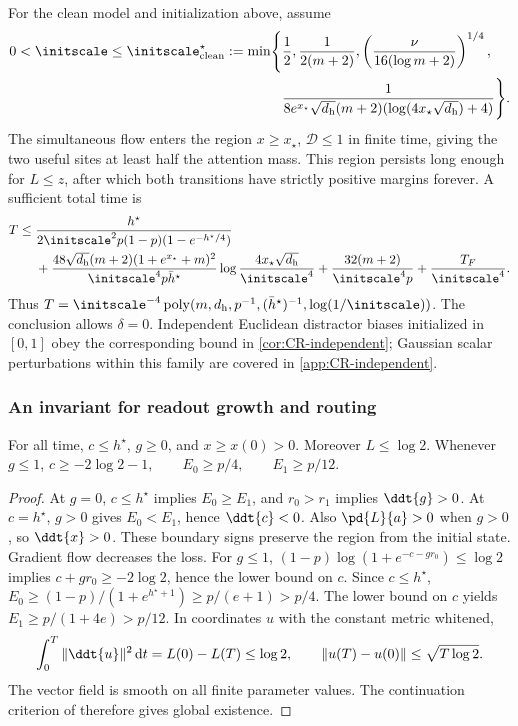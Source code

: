 \begin{proposition}\label{prop:clean-routing}
For the clean model and initialization above, assume
\begin{equation}
 \begin{aligned}
 0<\initscale\le\initscale^\star_{\mathrm{clean}}:=\min\Biggl\{&\frac12,\frac1{2(m+2)},
 \left(\frac{\nu}{16(\log m+2)}\right)^{1/4},\\
 &\frac1{8e^{x_\star}\sqrt{d_{\mathrm h}}(m+2)(\log(4x_\star\sqrt{d_{\mathrm h}})+4)}\Biggr\}.
 \end{aligned}
 \label{eq:CR-scale}
\end{equation}
The simultaneous flow enters the region $x\ge x_\star$, $\mathcal D\le1$ in finite time, giving the two useful sites at least half the attention mass. This region persists long enough for $L\le z$, after which both transitions have strictly positive margins forever. A sufficient total time is
\begin{align}
 T\le{}&\frac{h^\star}{2\initscale^2 p(1-p)(1-e^{-h^\star/4})}\notag\\
 &+\frac{48\sqrt{d_{\mathrm h}}(m+2)(1+e^{x_\star}+m)^2}{\initscale^4p\bar h^\star}
       \log\frac{4x_\star\sqrt{d_{\mathrm h}}}{\initscale^4}
 +\frac{32(m+2)}{\initscale^4p}+\frac{T_F}{\initscale^4}.\label{eq:CR-time}
\end{align}
Thus $T=\initscale^{-4}\operatorname{poly}(m,d_{\mathrm h},p^{-1},(\bar h^\star)^{-1},\log(1/\initscale))$.
The conclusion allows $\delta=0$. Independent Euclidean distractor biases
initialized in $[0,1]$ obey the corresponding bound in
\cref{cor:CR-independent}; Gaussian scalar perturbations within this family
are covered in \cref{app:CR-independent}.
\end{proposition}

\subsubsection{An invariant for readout growth and routing}
\begin{lemma}
\label{lem:CR-align}
For all time, $c\le h^\star$, $g\ge0$, and $x\ge x(0)>0$. Moreover $L\le\log2$. Whenever $g\le1$,
 $c\ge-2\log2-1,\qquad E_0\ge p/4,\qquad E_1\ge p/12.$ 
\end{lemma}
\begin{proof}
At $g=0$, $c\le h^\star$ implies $E_0\ge E_1$, and $r_0>r_1$ implies $\ddt{g}>0$.
At $c=h^\star$, $g>0$ gives $E_0<E_1$, hence $\ddt{c}<0$. Also $\pd{L}{a}>0$ when $g>0$, so $\ddt{x}>0$.
These boundary signs preserve the region from the initial state. Gradient flow decreases the loss.
For $g\le1$, $(1-p)\log(1+e^{-c-gr_0})\le\log2$ implies $c+gr_0\ge-2\log2$, hence the lower bound on $c$.
Since $c\le h^\star$,
$E_0\ge(1-p)/(1+e^{h^\star+1})\ge p/(e+1)>p/4$.
The lower bound on $c$ yields $E_1\ge p/(1+4e)>p/12$.
In coordinates $u$ with the constant metric whitened,
\[
 \int_0^T\|\ddt{u}\|^2\,\mathrm d t=L(0)-L(T)\le\log2,\qquad
 \|u(T)-u(0)\|\le\sqrt{T\log2}.
\]
The vector field is smooth on all finite parameter values. The continuation criterion of \citet[Corollary~2.15]{teschl2012ode} therefore gives global existence.
\end{proof}

